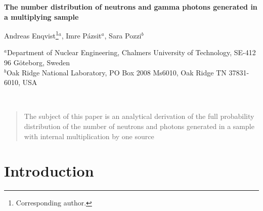 \documentclass[12pt,a4paper]{article}
\begin{document}
\begin{center}

  \textbf{\Large{The number distribution of neutrons and gamma photons generated in a multiplying sample}}

 \vspace{0.4 cm}

  \large{Andreas Enqvist\footnote{Corresponding author.}$^{a}$, Imre P\'{a}zsit$^{a}$, Sara Pozzi$^{b}$}
\vspace{0.2 cm}

  $^{a}$Department of Nuclear Engineering, Chalmers University of Technology, SE-412 96 G\"{o}teborg,
  Sweden\\
  $^{b}$Oak Ridge National Laboratory, PO Box 2008 Ms6010, Oak Ridge TN 37831-6010, USA

  \vspace{1 cm} %


  \ %

\end{center}

\begin{abstract}

The subject of this paper is an analytical derivation of the full
probability distribution of the number of neutrons and photons
generated in a sample with internal multiplication by one source

\end{abstract}

\section{Introduction}
\end{document}
